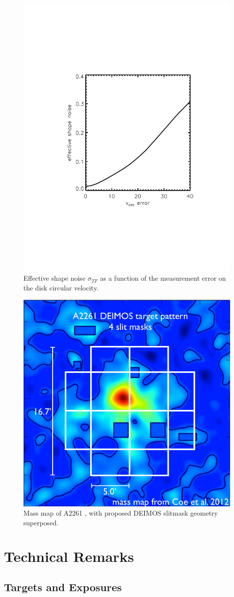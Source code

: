 \documentclass[12pt]{article}
\begin{document}
\begin{figure}[t]
\begin{center}
\includegraphics[width=0.45\linewidth, bb= 150 150 550 650,clip]{Plots/vcirc_error.pdf}
\caption{\footnotesize Effective shape noise $\sigma_{TF}$ as a  function of the
  measurement error on the disk circular velocity.}
\label{fig:shapeNoise}
\end{center}
\end{figure}


\begin{figure}[t]
\begin{center}
\includegraphics[width=0.45\linewidth]{Plots/a2261_deimos_mask.pdf}
\caption{\footnotesize Mass map of A2261 , with proposed DEIMOS slitmask geometry superposed.}
\label{fig:maskoverlay}
\end{center}
\end{figure}



\section{Technical Remarks}

\subsection{Targets and Exposures}
\end{document}
